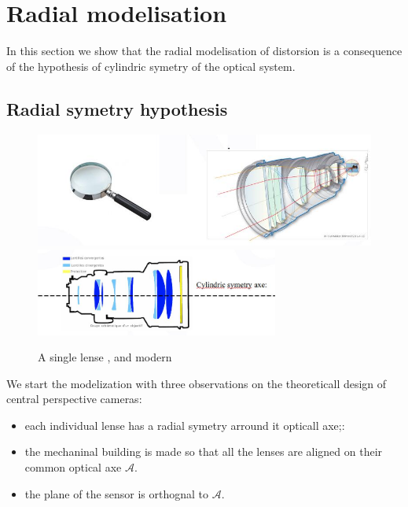 
\section{Radial modelisation}

In this section we  show that the radial modelisation of distorsion is a consequence
of the hypothesis of cylindric symetry of the optical system.


\subsection{Radial symetry hypothesis}

\begin{figure}
\centering
	\includegraphics[width=12cm]{Methods/Images/Lenses.jpg} \\
	\includegraphics[width=8cm]{Methods/Images/LensesCyl.jpg}
	\caption{A single lense , and modern }
	\label{fig:Lenses}
\end{figure}

We start the modelization with three observations on the theoreticall design of central perspective cameras:

\begin{itemize}
    \item  each individual lense has a radial symetry arround it opticall axe;:
    \item  the mechaninal building is made so that all the lenses are aligned on
	    their common optical axe $\mathcal{A}$.
    \item  the plane of the sensor is orthognal to $\mathcal{A}$.
\end{itemize}

